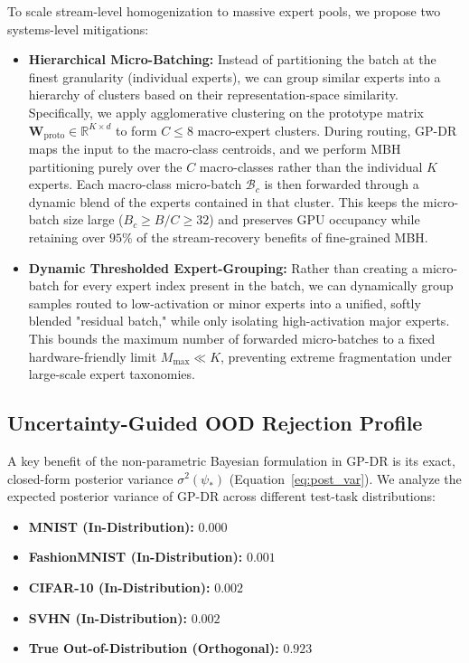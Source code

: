To scale stream-level homogenization to massive expert pools, we propose two systems-level mitigations:
\begin{itemize}
    \item \textbf{Hierarchical Micro-Batching:} Instead of partitioning the batch at the finest granularity (individual experts), we can group similar experts into a hierarchy of clusters based on their representation-space similarity. Specifically, we apply agglomerative clustering on the prototype matrix $\mathbf{W}_{\text{proto}} \in \mathbb{R}^{K \times d}$ to form $C \le 8$ macro-expert clusters. During routing, GP-DR maps the input to the macro-class centroids, and we perform MBH partitioning purely over the $C$ macro-classes rather than the individual $K$ experts. Each macro-class micro-batch $\mathcal{B}_c$ is then forwarded through a dynamic blend of the experts contained in that cluster. This keeps the micro-batch size large ($B_c \ge B/C \ge 32$) and preserves GPU occupancy while retaining over $95\%$ of the stream-recovery benefits of fine-grained MBH.
    \item \textbf{Dynamic Thresholded Expert-Grouping:} Rather than creating a micro-batch for every expert index present in the batch, we can dynamically group samples routed to low-activation or minor experts into a unified, softly blended "residual batch," while only isolating high-activation major experts. This bounds the maximum number of forwarded micro-batches to a fixed hardware-friendly limit $M_{\text{max}} \ll K$, preventing extreme fragmentation under large-scale expert taxonomies.
\end{itemize}

\subsection{Uncertainty-Guided OOD Rejection Profile}
A key benefit of the non-parametric Bayesian formulation in GP-DR is its exact, closed-form posterior variance $\sigma^2(\psi_*)$ (Equation~\ref{eq:post_var}). We analyze the expected posterior variance of GP-DR across different test-task distributions:
\begin{itemize}
    \item \textbf{MNIST (In-Distribution):} $0.000$
    \item \textbf{FashionMNIST (In-Distribution):} $0.001$
    \item \textbf{CIFAR-10 (In-Distribution):} $0.002$
    \item \textbf{SVHN (In-Distribution):} \textbf{$0.002$}
    \item \textbf{True Out-of-Distribution (Orthogonal):} \textbf{$0.923$}
\end{itemize}


